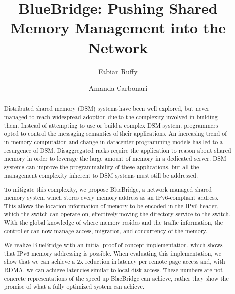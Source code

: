 \documentclass[sigconf]{acmart}
\begin{document}
\title{BlueBridge: Pushing Shared Memory Management into the Network}


\author{Fabian Ruffy}

\author{Amanda Carbonari}



\begin{abstract}

Distributed shared memory (DSM) systems have been well explored, but never managed to reach widespread adoption due to the complexity involved in building them. Instead of attempting to use or build a complex DSM system, programmers opted to control the messaging semantics of their applications. An increasing trend of in-memory computation and change in datacenter programming models has led to a resurgence of DSM. Disaggregated racks require the application to reason about shared memory in order to leverage the large amount of memory in a dedicated server. DSM systems can improve the programmability of these applications, but all the management complexity inherent to DSM systems must still be addressed.

To mitigate this complexity, we propose BlueBridge, a network managed shared memory system which stores every memory address as an IPv6-compliant address. This allows the location information of memory to be encoded in the IPv6 header, which the switch can operate on, effectively moving the directory service to the switch. With the global knowledge of where memory resides and the traffic information, the controller can now manage access, migration, and concurrency of the memory.

We realize BlueBridge with an initial proof of concept implementation, which shows that IPv6 memory addressing is possible. When evaluating this implementation, we show that we can achieve a 2x reduction in latency per remote page access and, with RDMA, we can achieve latencies similar to local disk access. These numbers are not concrete representations of the speed up BlueBridge can achieve, rather they show the promise of what a fully optimized system can achieve. 
\end{abstract}
\end{document}
